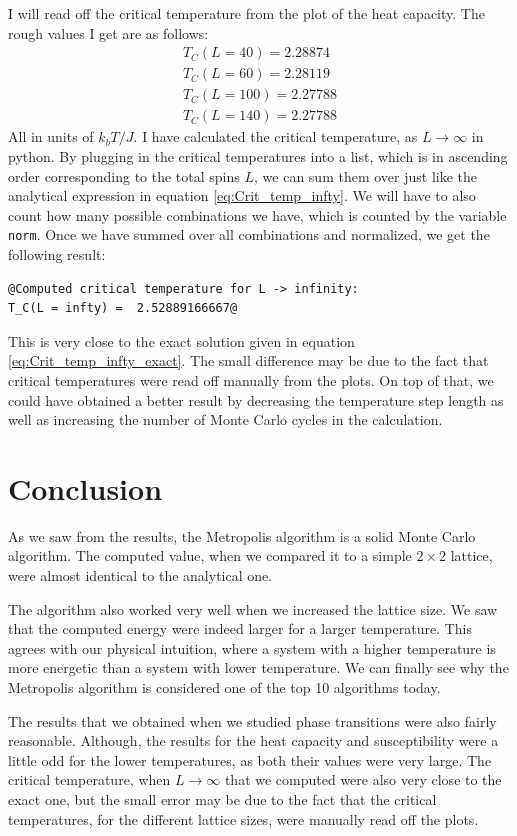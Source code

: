 \documentclass[12pt]{article}
\begin{document}
I will read off the critical temperature from the plot of the heat capacity. The rough values I get are as follows:
\begin{align*}
T_C(L=40) = 2.28874 \\
T_C(L=60) = 2.28119 \\
T_C(L=100) = 2.27788 \\
T_C(L=140) = 2.27788
\end{align*}
All in units of $k_bT/J$. I have calculated the critical temperature, as $L\to \infty$ in python. By plugging in the critical temperatures into a list, which is in ascending order corresponding to the total spins $L$, we can sum them over just like the analytical expression in equation \ref{eq:Crit_temp_infty}. We will have to also count how many possible combinations we have, which is counted by the variable \texttt{norm}. Once we have summed over all combinations and normalized, we get the following result:
\begin{lstlisting}
@Computed critical temperature for L -> infinity:
T_C(L = infty) =  2.52889166667@
\end{lstlisting}
This is very close to the exact solution given in equation \ref{eq:Crit_temp_infty_exact}. The small difference may be due to the fact that critical temperatures were read off manually from the plots. On top of that, we could have obtained a better result by decreasing the temperature step length as well as increasing the number of Monte Carlo cycles in the calculation.

\FloatBarrier
\section{Conclusion} \label{section:conclusion}
As we saw from the results, the Metropolis algorithm is a solid Monte Carlo algorithm. The computed value, when we compared it to a simple $2\times 2$ lattice, were almost identical to the analytical one. 

The algorithm also worked very well when we increased the lattice size. We saw that the computed energy were indeed larger for a larger temperature. This agrees with our physical intuition, where a system with a higher temperature is more energetic than a system with lower temperature. We can finally see why the Metropolis algorithm is considered one of the top 10 algorithms today.

The results that we obtained when we studied phase transitions were also fairly reasonable. Although, the results for the heat capacity and susceptibility were a little odd for the lower temperatures, as both their values were very large. The critical temperature, when $L\to \infty$ that we computed were also very close to the exact one, but the small error may be due to the fact that the critical  temperatures, for the different lattice sizes, were manually read off the plots.
\end{document}
